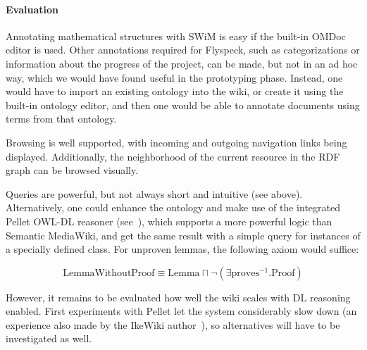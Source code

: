 \begin{evaluation}
\paragraph{Evaluation} Annotating mathematical structures with SWiM is easy if
the built-in OMDoc editor is used.  Other annotations required for Flyspeck,
such as categorizations or information about the progress of the project, can be
made, but not in an ad hoc way, which we would have found useful in the
prototyping phase.  Instead, one would have to import an existing ontology into
the wiki, or create it using the built-in ontology editor, and then one would be
able to annotate documents using terms from that ontology.

Browsing is well supported, with incoming and outgoing navigation links being
displayed.  Additionally, the neighborhood of the current resource in the RDF
graph can be browsed visually.

Queries are powerful, but not always short and intuitive (see above).
Alternatively, one could enhance the ontology and make use of the integrated
Pellet OWL-DL reasoner (see~\cite{KrSchVr:semwiki-reasoning07}), which
supports a more powerful logic than Semantic MediaWiki, and get the same result
with a simple query for instances of a specially defined class.  For unproven
lemmas, the following axiom would suffice:

\[
\mbox{LemmaWithoutProof}\equiv\mbox{Lemma}\sqcap\neg(\exists\mbox{proves}^{-1}.\mbox{Proof})
\]

However, it remains to be evaluated how well the wiki scales with DL reasoning
enabled.  First experiments with Pellet let the system considerably slow down
(an experience also made by the IkeWiki author~\cite{KrSchVr:semwiki-reasoning07}), so
alternatives will have to be investigated as well.
\end{evaluation}

